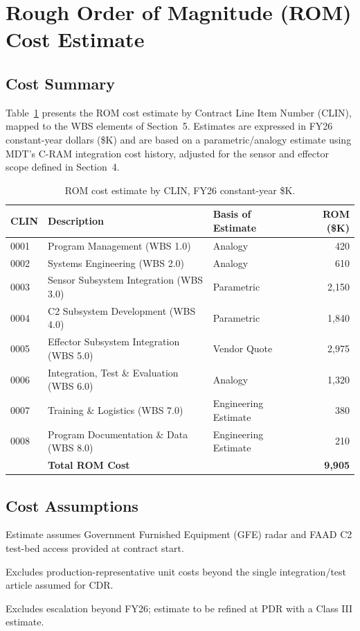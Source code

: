 \section{Rough Order of Magnitude (ROM) Cost Estimate}

\subsection{Cost Summary}
Table~\ref{tab:cost} presents the ROM cost estimate by Contract Line Item Number (CLIN), mapped to the WBS elements of Section~5. Estimates are expressed in FY26 constant-year dollars (\$K) and are based on a parametric/analogy estimate using MDT's C-RAM integration cost history, adjusted for the sensor and effector scope defined in Section~4.

\begin{table}[htbp]
\centering
\footnotesize
\begin{tabularx}{\linewidth}{@{}l >{\raggedright\arraybackslash}X l r@{}}
\toprule
\rowcolor{accentlight}
\textbf{CLIN} & \textbf{Description} & \textbf{Basis of Estimate} & \textbf{ROM (\$K)} \\
\midrule
0001 & Program Management (WBS 1.0) & Analogy & 420 \\
0002 & Systems Engineering (WBS 2.0) & Analogy & 610 \\
0003 & Sensor Subsystem Integration (WBS 3.0) & Parametric & 2{,}150 \\
0004 & C2 Subsystem Development (WBS 4.0) & Parametric & 1{,}840 \\
0005 & Effector Subsystem Integration (WBS 5.0) & Vendor Quote & 2{,}975 \\
0006 & Integration, Test \& Evaluation (WBS 6.0) & Analogy & 1{,}320 \\
0007 & Training \& Logistics (WBS 7.0) & Engineering Estimate & 380 \\
0008 & Program Documentation \& Data (WBS 8.0) & Engineering Estimate & 210 \\
\midrule
\rowcolor{panelbg}
 & \textbf{Total ROM Cost} & & \textbf{9{,}905} \\
\bottomrule
\end{tabularx}
\caption{ROM cost estimate by CLIN, FY26 constant-year \$K.}
\label{tab:cost}
\end{table}

\subsection{Cost Assumptions}
\begin{reqlist}
\item Estimate assumes Government Furnished Equipment (GFE) radar and FAAD C2 test-bed access provided at contract start.
\item Excludes production-representative unit costs beyond the single integration/test article assumed for CDR.
\item Excludes escalation beyond FY26; estimate to be refined at PDR with a Class III estimate.
\end{reqlist}

\clearpage

